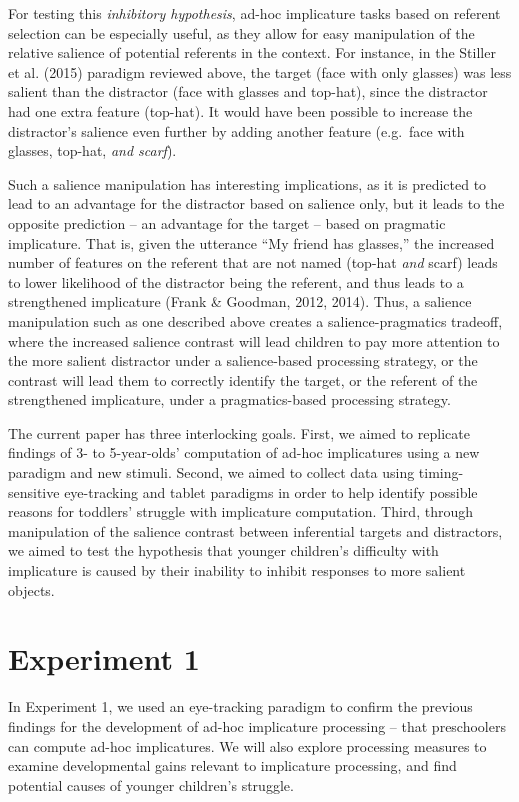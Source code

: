 \documentclass[a4paper,man,apacite,floatsintext]{apa6}
\begin{document}
For testing this \emph{inhibitory hypothesis}, ad-hoc implicature tasks
based on referent selection can be especially useful, as they allow for
easy manipulation of the relative salience of potential referents in the
context. For instance, in the Stiller et al. (2015) paradigm reviewed
above, the target (face with only glasses) was less salient than the
distractor (face with glasses and top-hat), since the distractor had one
extra feature (top-hat). It would have been possible to increase the
distractor's salience even further by adding another feature (e.g.~face
with glasses, top-hat, \emph{and scarf}).

Such a salience manipulation has interesting implications, as it is
predicted to lead to an advantage for the distractor based on salience
only, but it leads to the opposite prediction -- an advantage for the
target -- based on pragmatic implicature. That is, given the utterance
``My friend has glasses,'' the increased number of features on the
referent that are not named (top-hat \emph{and} scarf) leads to lower
likelihood of the distractor being the referent, and thus leads to a
strengthened implicature (Frank \& Goodman, 2012, 2014). Thus, a
salience manipulation such as one described above creates a
salience-pragmatics tradeoff, where the increased salience contrast will
lead children to pay more attention to the more salient distractor under
a salience-based processing strategy, or the contrast will lead them to
correctly identify the target, or the referent of the strengthened
implicature, under a pragmatics-based processing strategy.

The current paper has three interlocking goals. First, we aimed to
replicate findings of 3- to 5-year-olds' computation of ad-hoc
implicatures using a new paradigm and new stimuli. Second, we aimed to
collect data using timing-sensitive eye-tracking and tablet paradigms in
order to help identify possible reasons for toddlers' struggle with
implicature computation. Third, through manipulation of the salience
contrast between inferential targets and distractors, we aimed to test
the hypothesis that younger children's difficulty with implicature is
caused by their inability to inhibit responses to more salient objects.

\section{Experiment 1}\label{experiment-1}

In Experiment 1, we used an eye-tracking paradigm to confirm the
previous findings for the development of ad-hoc implicature processing
-- that preschoolers can compute ad-hoc implicatures. We will also
explore processing measures to examine developmental gains relevant to
implicature processing, and find potential causes of younger children's
struggle.
\end{document}
